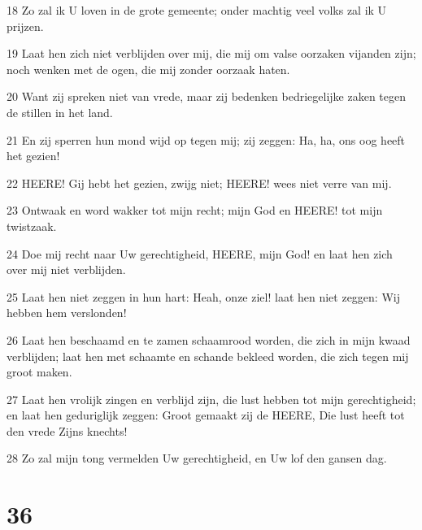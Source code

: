 \par 18 Zo zal ik U loven in de grote gemeente; onder machtig veel volks zal ik U prijzen.
\par 19 Laat hen zich niet verblijden over mij, die mij om valse oorzaken vijanden zijn; noch wenken met de ogen, die mij zonder oorzaak haten.
\par 20 Want zij spreken niet van vrede, maar zij bedenken bedriegelijke zaken tegen de stillen in het land.
\par 21 En zij sperren hun mond wijd op tegen mij; zij zeggen: Ha, ha, ons oog heeft het gezien!
\par 22 HEERE! Gij hebt het gezien, zwijg niet; HEERE! wees niet verre van mij.
\par 23 Ontwaak en word wakker tot mijn recht; mijn God en HEERE! tot mijn twistzaak.
\par 24 Doe mij recht naar Uw gerechtigheid, HEERE, mijn God! en laat hen zich over mij niet verblijden.
\par 25 Laat hen niet zeggen in hun hart: Heah, onze ziel! laat hen niet zeggen: Wij hebben hem verslonden!
\par 26 Laat hen beschaamd en te zamen schaamrood worden, die zich in mijn kwaad verblijden; laat hen met schaamte en schande bekleed worden, die zich tegen mij groot maken.
\par 27 Laat hen vrolijk zingen en verblijd zijn, die lust hebben tot mijn gerechtigheid; en laat hen geduriglijk zeggen: Groot gemaakt zij de HEERE, Die lust heeft tot den vrede Zijns knechts!
\par 28 Zo zal mijn tong vermelden Uw gerechtigheid, en Uw lof den gansen dag.

\chapter{36}

